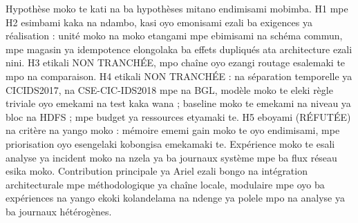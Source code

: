 Hypothèse moko te kati na ba hypothèses mitano endimisami mobimba. H1 mpe
H2 esimbami kaka na ndambo, kasi oyo emonisami ezali ba exigences ya
réalisation : unité moko na moko etangami mpe ebimisami na schéma commun,
mpe magasin ya idempotence elongolaka ba effets dupliqués ata architecture
ezali nini. H3 etikali NON TRANCHÉE, mpo chaîne oyo ezangi routage
esalemaki te mpo na comparaison. H4 etikali NON TRANCHÉE : na séparation
temporelle ya CICIDS2017, na CSE-CIC-IDS2018 mpe na BGL, modèle moko te
eleki règle triviale oyo emekami na test kaka wana ; baseline moko te
emekami na niveau ya bloc na HDFS ; mpe budget ya ressources etyamaki te.
H5 eboyami (RÉFUTÉE) na critère na yango moko : mémoire ememi gain moko te
oyo endimisami, mpe priorisation oyo esengelaki kobongisa emekamaki te.
Expérience moko te esali analyse ya incident moko na nzela ya ba journaux
système mpe ba flux réseau esika moko.
Contribution principale ya Ariel \logminer{} ezali bongo na intégration
architecturale mpe méthodologique ya chaîne locale, modulaire
mpe oyo ba expériences na yango ekoki kolandelama na ndenge ya polele
mpo na analyse ya ba journaux hétérogènes.
